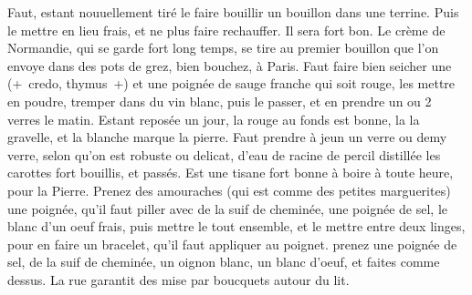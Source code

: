 \pend%
\pstart%
\protect{}%
Faut, estant nouuellement tir\'{e} le faire bouillir un bouillon dans une terrine. Puis le mettre en lieu frais, et ne plus faire rechauffer. Il sera fort bon.
\pend%
\pstart%
Le crème de Normandie, qui se garde fort long temps, se tire au premier bouillon que l'on envoye dans des pots de grez, bien bouchez, \`{a} Paris.\protect{}
\pend%
\pstart%
\protect{}
Faut faire bien seicher une 
(+~credo, thymus~+)
et une poign\'{e}e de sauge franche qui soit rouge, les mettre en poudre, tremper dans du vin\protect{} blanc, puis le passer, et en prendre un ou 2 verres le matin.
\pend%
\pstart%
\protect{}
Estant repos\'{e}e un jour, la rouge au fonds est bonne, la
la gravelle\protect{}, et la blanche marque la pierre\protect{}.
\pend%
\pstart%
\protect{}
Faut prendre \`{a} jeun un verre ou demy verre, selon qu'on est robuste ou delicat, d'eau de racine de percil\protect{} distill\'{e}e les carottes\protect{} fort bouillis, et pass\'{e}s. Est une tisane\protect{} fort bonne \`{a} boire \`{a} toute heure, pour la Pierre\protect{}.
\pend%
\pstart%
\protect{}\protect{}
Prenez des amouraches\protect{} (qui est comme des petites marguerites\protect{}) une poign\'{e}e, qu'il faut piller avec de la suif\protect{} de chemin\'{e}e, une poign\'{e}e de sel\protect{}, le blanc d'un oeuf\protect{} frais, puis mettre le tout ensemble, et le mettre entre deux linges, pour en faire un bracelet, qu'il faut appliquer au poignet.  prenez une poign\'{e}e de sel\protect{}, de la suif\protect{} de chemin\'{e}e, un oignon\protect{} blanc, un blanc d'oeuf\protect{}, et faites comme dessus. La rue\protect{} garantit des \protect{} mise par boucquets autour du lit.
